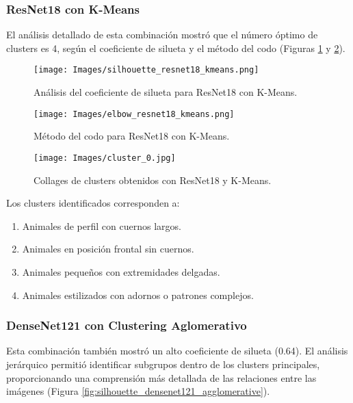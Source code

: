\subsubsection{ResNet18 con K-Means}

El análisis detallado de esta combinación mostró que el número óptimo de clusters es 4, según el coeficiente de silueta y el método del codo (Figuras \ref{fig:silhouette_resnet18_kmeans} y \ref{fig:elbow_resnet18_kmeans}).

\begin{figure}[!ht]
    \centering
    \texttt{[image: Images/silhouette\_resnet18\_kmeans.png]}
    \caption{Análisis del coeficiente de silueta para ResNet18 con K-Means.}
    \label{fig:silhouette_resnet18_kmeans}
\end{figure}

\begin{figure}[!ht]
    \centering
    \texttt{[image: Images/elbow\_resnet18\_kmeans.png]}
    \caption{Método del codo para ResNet18 con K-Means.}
    \label{fig:elbow_resnet18_kmeans}
\end{figure}

\begin{figure}[!ht]
    \centering
    \texttt{[image: Images/cluster\_0.jpg]}
    \caption{Collages de clusters obtenidos con ResNet18 y K-Means.}
    \label{fig:clusters_resnet18_kmeans}
\end{figure}

Los clusters identificados corresponden a:

\begin{enumerate}
    \item Animales de perfil con cuernos largos.
    \item Animales en posición frontal sin cuernos.
    \item Animales pequeños con extremidades delgadas.
    \item Animales estilizados con adornos o patrones complejos.
\end{enumerate}

\subsubsection{DenseNet121 con Clustering Aglomerativo}

Esta combinación también mostró un alto coeficiente de silueta (0.64). El análisis jerárquico permitió identificar subgrupos dentro de los clusters principales, proporcionando una comprensión más detallada de las relaciones entre las imágenes (Figura \ref{fig:silhouette_densenet121_agglomerative}).

